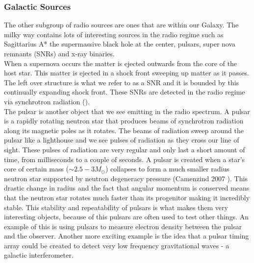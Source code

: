 \documentclass[a4paper, 10pt]{article}
\begin{document}
\subsubsection{Galactic Sources}
The other subgroup of radio sources are ones that are within our Galaxy. The milky way contains lots of interesting sources in the radio regime such as Sagittarius A* the supermassive black hole at the center, pulsars, super nova remnants (SNRs) and x-ray binaries.\\

When a supernova occurs the matter is ejected outwards from the core of the host star. This matter is ejected in a shock front sweeping up matter as it passes. The left over structure is what we refer to as a SNR and it is bounded by this continually expanding shock front. These SNRs are detected in the radio regime via synchrotron radiation (\citet{Mayer}).\\

The pulsar is another object that we see emitting in the radio spectrum. A pulsar is a rapidly rotating neutron star that produces beams of synchrotron radiation along its magnetic poles as it rotates.  The beams of radiation sweep around the pulsar like a lighthouse and we see pulses of radiation as they cross our line of sight. These pulses of radiation are very regular and only last a short amount of time, from milliseconds to a couple of seconds. A pulsar is created when a star's core of certain mass ($\sim2.5-3 M_\odot$) collapses to form a much smaller radius neutron star supported by neutron degeneracy pressure (Camenzind 2007 \citet{Camezind}). This drastic change in radius and the fact that angular momentum is conserved means that the neutron star rotates much faster than its progenitor making it incredibly stable. This stability and repeatability of pulsars is what makes them very interesting objects, because of this pulsars are often used to test other things. An example of this is using pulsars to measure electron density between the pulsar and the observer. Another more exciting example is the idea that a pulsar timing array could be created to detect very low frequency gravitational waves - a galactic interferometer.\\
\end{document}
